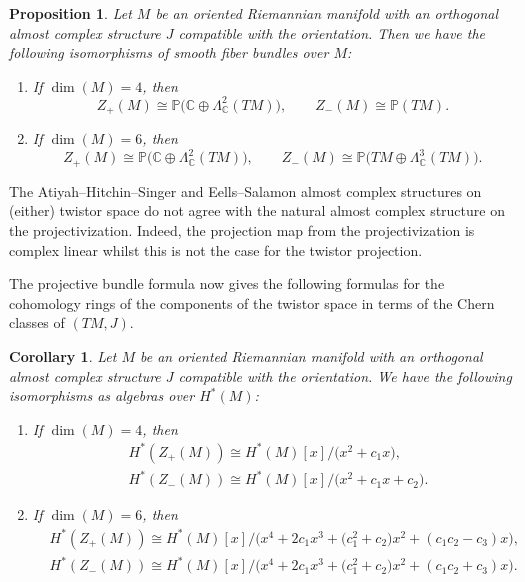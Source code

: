 \documentclass[pdftex]{sigma}%
\newcommand{\C}{\mathbb{C}}
\numberwithin{equation}{section}
\newtheorem{Corollary}[Theorem]{Corollary}
\newtheorem{Proposition}[Theorem]{Proposition}
 { \theoremstyle{definition}
\newtheorem{Definition}[Theorem]{Definition}
\newtheorem{Note}[Theorem]{Note}
\newtheorem{Example}[Theorem]{Example}
\newtheorem{Remark}[Theorem]{Remark} }
\begin{document}
\begin{Proposition}\label{identification}
Let $M$ be an oriented Riemannian manifold with an orthogonal almost complex structure $J$ compatible with the orientation. Then we have the following isomorphisms of smooth fiber bundles over $M$:
\begin{enumerate}\itemsep=0pt
\item[$1.$] If $\dim(M)=4$, then
\[
Z_+(M) \cong \mathbb{P}\big( \C \oplus \Lambda^2_\C(TM)\big), \qquad Z_{-}(M) \cong \mathbb{P}( TM).
\]
\item[$2.$] If $\dim(M)=6$, then
\[
Z_+(M) \cong \mathbb{P}\big( \C \oplus \Lambda^2_\C(TM)\big), \qquad Z_{-}(M) \cong \mathbb{P}\big( TM \oplus \Lambda_\C^3(TM)\big).
\]
\end{enumerate}
\end{Proposition}

\begin{Remark}
 The Atiyah--Hitchin--Singer and Eells--Salamon almost complex structures on (either) twistor space do not agree with the natural almost complex structure on the projectivization. Indeed, the projection map from the projectivization is complex linear whilst this is not the case for the twistor projection.
\end{Remark}

The projective bundle formula now gives the following formulas for the cohomology rings of the components of the twistor space in terms of the
Chern classes of $(TM, J)$.

\begin{Corollary}
\label{cohomtwis}
Let $M$ be an oriented Riemannian manifold with an orthogonal almost complex structure $J$ compatible with the orientation. We have the following isomorphisms as algebras over $H^*(M)$:
\begin{enumerate}\itemsep=0pt
\item[$1.$] If $\dim(M)=4$, then
\begin{align*}
&H^*(Z_+(M))\cong H^*(M)[x]/\big(x^2+c_1 x\big), \\
&H^*(Z_{-}(M))\cong H^*(M)[x]/\big(x^2 + c_1 x + c_2\big).
\end{align*}
\item[$2.$] If $\dim(M)=6$, then
\begin{align*}
&H^*(Z_+(M))\cong H^*(M)[x]/\big(x^4 +2c_1x^3 +\big(c_1^2+c_2\big) x^2 + (c_1c_2-c_3)x\big), \\
&H^*(Z_{-}(M))\cong H^*(M)[x]/\big(x^4 + 2c_1x^3+ \big(c_1^2+c_2\big)x^2 + (c_1c_2+c_3)x\big). \end{align*}
\end{enumerate}
\end{Corollary}
\end{document}
